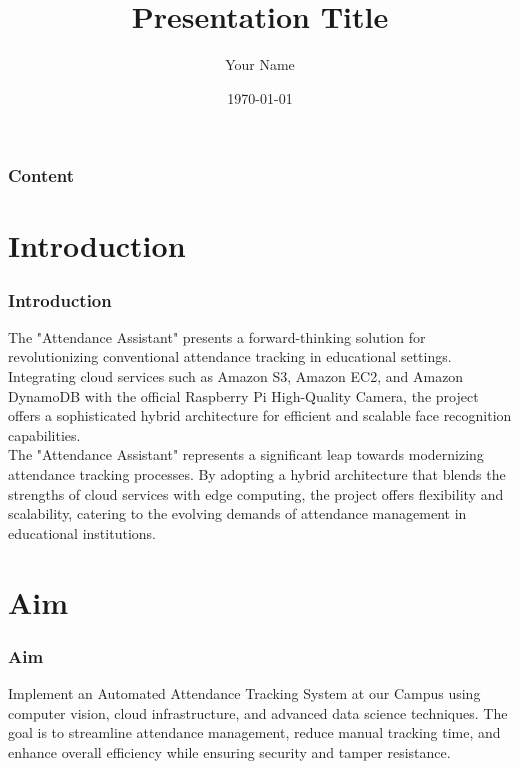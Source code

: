 \documentclass[aspectratio=169]{beamer}
\title{Presentation Title}
\author{Your Name}
\date{\today}
\begin{document}
\begin{frame}
  \titlepage
\end{frame}

\begin{frame}
  \frametitle{Content}
  \tableofcontents
\end{frame}

\section{Introduction}
\begin{frame}
  \frametitle{Introduction}
  The "Attendance Assistant" presents a forward-thinking solution for revolutionizing conventional attendance tracking in educational settings. Integrating cloud services such as Amazon S3, Amazon EC2, and Amazon DynamoDB with the official Raspberry Pi High-Quality Camera, the project offers a sophisticated hybrid architecture for efficient and scalable face recognition capabilities.\\
  \vspace{0.5cm}
  The "Attendance Assistant" represents a significant leap towards modernizing attendance tracking processes. By adopting a hybrid architecture that blends the strengths of cloud services with edge computing, the project offers flexibility and scalability, catering to the evolving demands of attendance management in educational institutions.  
\end{frame}

\section{Aim}
\begin{frame}
  \frametitle{Aim}
  Implement an Automated Attendance Tracking System at our Campus using computer vision, cloud infrastructure, and advanced data science techniques. The goal is to streamline attendance management, reduce manual tracking time, and enhance overall efficiency while ensuring security and tamper resistance.
\end{frame}
\end{document}
